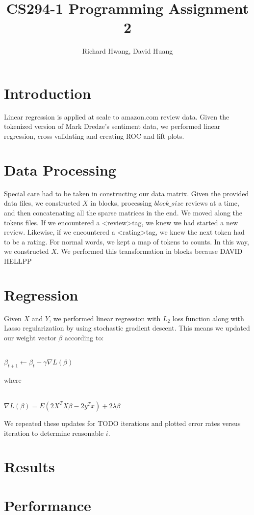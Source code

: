 \documentclass[11pt]{article}
\title{CS294-1 Programming Assignment 2}
\author{Richard Hwang, David Huang}
\begin{document}
\maketitle

\section{Introduction}
Linear regression is applied at scale to amazon.com review data.  Given the tokenized version of Mark Dredze's sentiment data, we performed linear regression, cross validating and creating ROC and lift plots.

\section{Data Processing}
Special care had to be taken in constructing our data matrix.  Given the provided data files, we constructed $X$ in blocks, processing $block\_size$ reviews at a time, and then concatenating all the sparse matrices in the end.  We moved along the tokens files.  If we encountered a \textless review\textgreater tag, we knew we had started a new review.  Likewise, if we encountered a \textless rating\textgreater tag, we knew the next token had to be a rating.  For normal words, we kept a map of tokens to counts.  In this way, we constructed $X$.  We performed this transformation in blocks because DAVID HELLPP

\section{Regression}
Given $X$ and $Y$, we performed linear regression with $L_2$ loss function along with Lasso regularization by using stochastic gradient descent.  This means we updated our weight vector $\beta$ according to:\\\\
\centerline{$\beta_{t+1} \leftarrow \beta_{t} - \gamma \nabla L(\beta)$}
where\\\\
\centerline{$\nabla L(\beta) = E(2X^T X \beta - 2 y^T x) + 2 \lambda \beta$}
We repeated these updates for TODO iterations and plotted error rates versus iteration to determine reasonable $i$.

\section{Results}


\section{Performance}
\end{document}
